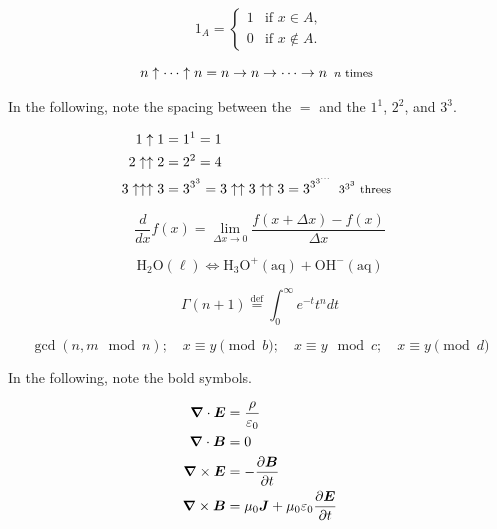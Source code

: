 \documentclass{article}
\begin{document}
\setcounter{equation}{11}

\begin{equation}
    1_A =
    \begin{cases}
        1 & \text{if } x \in A, \\
        0 & \text{if } x \notin A.
    \end{cases}
\end{equation}

\begin{equation}
    n \uparrow \cdots \uparrow n = n \to n \to \cdots \to n
    \begin{array}{c}
        \text{\footnotesize $n$ times}
    \end{array}
\end{equation}

\noindent In the following, note the spacing between the $=$ and the $1^1$, $2^2$, and $3^3$.

\begin{align}
    1 \uparrow 1 &= 1^1 = 1 \notag \\
    2 \uparrow \uparrow 2 &= 2^{2} = 4 \notag \\
    3 \uparrow \uparrow \uparrow 3 &= 3^{3^{3}} = 3 \uparrow \uparrow 3 \uparrow \uparrow 3 = 3^{3^{3^{\cdots}}}
    \begin{array}{c}
        \text{\footnotesize $3^{3^{3}}$ threes}
    \end{array}
\end{align}

\begin{equation}
    \frac{d}{dx} f(x) = \lim_{\Delta x \to 0} \frac{f(x + \Delta x) - f(x)}{\Delta x}
\end{equation}

\begin{equation}
    \text{H}_2\text{O}(\ell) \iff \text{H}_3\text{O}^+(\text{aq}) + \text{OH}^-(\text{aq})
\end{equation}

\begin{equation}
    \Gamma(n + 1) \overset{\text{def}}{=} \int_0^\infty e^{-t}t^n dt
\end{equation}

\begin{equation}
    \gcd(n, m \mod n); \quad x \equiv y \pmod{b}; \quad x \equiv y \mod c; \quad x \equiv y \pmod{d}
\end{equation}

\noindent In the following, note the bold symbols.

\begin{align}
    \bm{\nabla} \cdot \bm{E} &= \frac{\rho}{\varepsilon_0} \notag \\
    \bm{\nabla} \cdot \bm{B} &= 0 \notag \\
    \bm{\nabla} \times \bm{E} &= -\frac{\partial \bm{B}}{\partial t} \notag \\
    \bm{\nabla} \times \bm{B} &= \mu_0 \bm{J} + \mu_0 \varepsilon_0 \frac{\partial \bm{E}}{\partial t}
\end{align}
\end{document}
